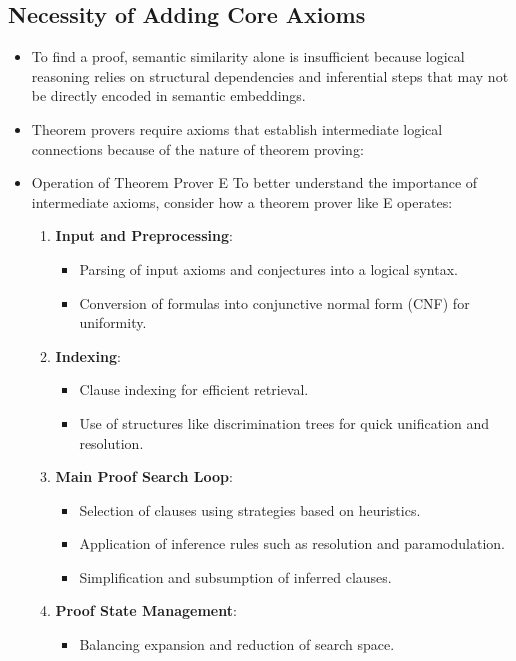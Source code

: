 \documentclass[english,version-2020-11]{uzl-thesis}
\begin{document}
\subsection{Necessity of Adding Core Axioms}
\begin{itemize}
    \item To find a proof, semantic similarity alone is insufficient because logical reasoning relies on structural dependencies and inferential steps that may not be directly encoded in semantic embeddings.
    \item Theorem provers require axioms that establish intermediate logical connections because of the nature of theorem proving:
    \item Operation of Theorem Prover E
    To better understand the importance of intermediate axioms, consider how a theorem prover like E operates:
    \begin{enumerate}
        \item \textbf{Input and Preprocessing}:
        \begin{itemize}
            \item Parsing of input axioms and conjectures into a logical syntax.
            \item Conversion of formulas into conjunctive normal form (CNF) for uniformity.
        \end{itemize}
        \item \textbf{Indexing}:
        \begin{itemize}
            \item Clause indexing for efficient retrieval.
            \item Use of structures like discrimination trees for quick unification and resolution.
        \end{itemize}
        \item \textbf{Main Proof Search Loop}:
        \begin{itemize}
            \item Selection of clauses using strategies based on heuristics.
            \item Application of inference rules such as resolution and paramodulation.
            \item Simplification and subsumption of inferred clauses.
        \end{itemize}
        \item \textbf{Proof State Management}:
        \begin{itemize}
            \item Balancing expansion and reduction of search space.

\end{itemize}
\end{enumerate}
\end{itemize}
\end{document}
